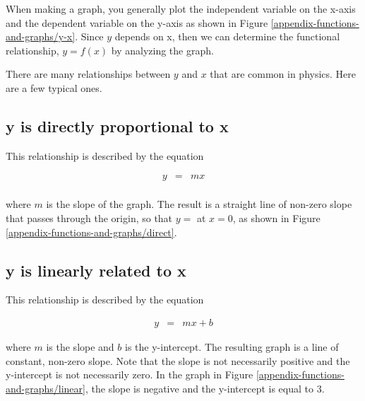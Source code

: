 
When making a graph, you generally plot the independent variable on the x-axis and the dependent variable on the y-axis as shown in Figure \ref{appendix-functions-and-graphs/y-x}.  Since $y$ depends on x, then we can determine the functional relationship, $y=f(x)$ by analyzing the graph.


There are many relationships between $y$ and $x$ that are common in physics.  Here are a few typical ones.

\subsection*{y is directly proportional to x}

This relationship is described by the equation

\begin{eqnarray*}
	y & = & mx \\
\end{eqnarray*}

where $m$ is the slope of the graph. The result is a straight line of non-zero slope that passes through the origin, so that $y=$ at $x=0$, as shown in Figure \ref{appendix-functions-and-graphs/direct}.


\subsection*{y is linearly related to x}

This relationship is described by the equation

\begin{eqnarray*}
	 y & = &  mx+b
\end{eqnarray*}	 

where $m$ is the slope and $b$ is the y-intercept.  The resulting graph is a line of constant, non-zero slope.  Note that the slope is not necessarily positive and the y-intercept is not necessarily zero.  In the graph in Figure \ref{appendix-functions-and-graphs/linear}, the slope is negative and the y-intercept is equal to 3.

 
